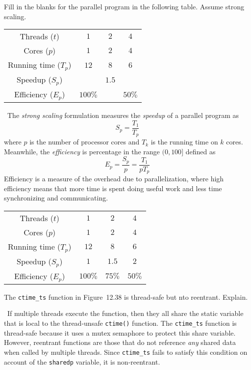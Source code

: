 \documentclass[12pt]{article}
\newenvironment{ex}[2][Exercise]{\begin{trivlist}
		\item[\hskip \labelsep {\bfseries #1}\hskip \labelsep {\bfseries #2.}]}{\end{trivlist}}
\newenvironment{sol}[1][Solution]{\begin{trivlist}
		\item[\hskip \labelsep {\bfseries #1:}]}{\end{trivlist}}
\begin{document}
\begin{ex}{12.11}
	Fill in the blanks for the parallel program in the following table. Assume strong scaling.
	\begin{center}
		\begin{tabular}{cccc}
			Threads ($t$) & $1$ & $2$ & $4$ \\
			Cores ($p$) & $1$ & $2$ & $4$ \\
			\hline
			Running time ($T_p$) & $12$ & $8$ & $6$ \\
			Speedup ($S_p$) & \makebox[1cm]{\hrulefill} & $1.5$ & \makebox[1cm]{\hrulefill}\\
			Efficiency ($E_p$) & $100\%$ & \makebox[1cm]{\hrulefill} & $50\%$
		\end{tabular}
	\end{center}
\end{ex}

\begin{sol}
	\
	The \emph{strong scaling} formulation measures the \emph{speedup} of a parallel program
	as 
	\[
	S_p=\frac{T_1}{T_p}
	\]
	where $p$ is the number of processor cores and $T_k$ is the running time on $k$ cores.
	Meanwhile, the \emph{efficiency} is  percentage in the range $(0,100]$ defined as
	\[
	E_p=\frac{S_p}{p}=\frac{T_1}{pT_p}
	\]
	Efficiency is a measure of the overhead due to parallelization, where high efficiency means
	that more time is spent doing useful work and less time synchronizing and communicating.
	\begin{center}
		\begin{tabular}{cccc}
			Threads ($t$) & $1$ & $2$ & $4$ \\
			Cores ($p$) & $1$ & $2$ & $4$ \\
			\hline
			Running time ($T_p$) & $12$ & $8$ & $6$ \\
			Speedup ($S_p$) & $1$ & $1.5$ & $2$ \\
			Efficiency ($E_p$) & $100\%$ & $75\%$ & $50\%$
		\end{tabular}
	\end{center}
\end{sol}

\begin{ex}{12.12}
	The \texttt{ctime\_ts} function in Figure~12.38 is thread-safe but nto reentrant. Explain.
\end{ex}

\begin{sol}
	\
	If multiple threads execute the function, then they all share the static variable that
	is local to the thread-unsafe \texttt{ctime()} function. The \texttt{ctime\_ts} function
	is thread-safe because it uses a mutex semaphore to protect this share variable. However,
	reentrant functions are those that do not reference \emph{any} shared data when called
	by multiple threads. Since \texttt{ctime\_ts} fails to satisfy this condition on account
	of the \texttt{sharedp} variable, it is non-reentrant.
\end{sol}
\end{document}
